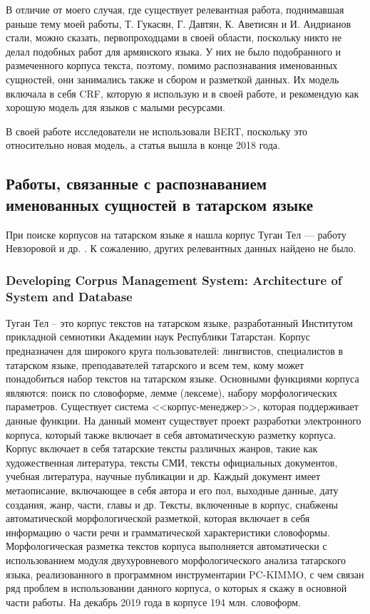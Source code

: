 В отличие от моего случая, где существует релевантная работа, поднимавшая раньше тему моей работы, Т. Гукасян, Г. Давтян, К. Аветисян и И. Андрианов стали, можно сказать, первопроходцами в своей области, поскольку никто не делал подобных работ для армянского языка. У них не было подобранного и размеченного корпуса текста, поэтому, помимо распознавания именованных сущностей, они занимались также и сбором и разметкой данных. Их модель включала в себя CRF, которую я использую и в своей работе, и рекомендую как хорошую модель для языков с малыми ресурсами.

В своей работе исследователи не использовали BERT, поскольку это относительно новая модель, а статья вышла в конце 2018 года.


\subsection{Работы, связанные с распознаванием именованных сущностей в татарском языке}

При поиске корпусов на татарском языке я нашла корпус Туган Тел --- работу Невзоровой и др. \cite{tugan_tel}. К сожалению, других релевантных данных найдено не было.

\subsubsection{Developing Corpus Management System:
Architecture of System and Database}

Туган Тел -- это корпус текстов на татарском языке, разработанный Институтом прикладной
семиотики Академии наук Республики Татарстан. Корпус предназначен для широкого круга 
пользователей: лингвистов, специалистов в татарском языке, преподавателей татарского и всем 
тем, кому может понадобиться набор текстов на татарском языке. Основными функциями корпуса 
являются: поиск  по словоформе, лемме (лексеме), набору морфологических параметров. 
Существует система <<корпус-менеджер>>, которая поддерживает данные функции.  На данный 
момент существует проект разработки электронного корпуса, который также включает в себя 
автоматическую разметку корпуса. Корпус включает в  себя татарские тексты различных жанров, такие как художественная литература, тексты СМИ, тексты официальных документов, учебная литература, научные публикации и др. Каждый документ имеет метаописание, включающее в себя автора и его пол, выходные данные, дату  создания, жанр, части, главы и др. Тексты, включенные в корпус, снабжены автоматической  морфологической разметкой, которая включает в себя информацию о части речи и 
грамматической характеристики словоформы. Морфологическая разметка текстов корпуса 
выполняется автоматически с использованием модуля двухуровневого морфологического анализа 
татарского языка, реализованного в программном инструментарии PC-KIMMO, с чем связан ряд 
проблем в использовании данного корпуса, о которых я скажу в основной части работы. На 
декабрь 2019 года в корпусе 194 млн. словоформ. 




